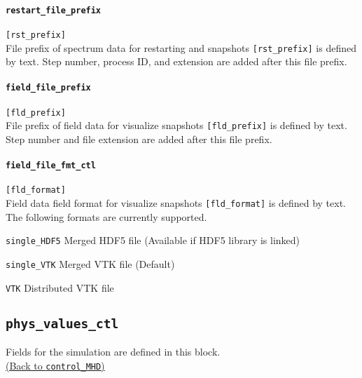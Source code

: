 \paragraph{\tt restart\_file\_prefix}
\label{href_t:restart_file_prefix}
\verb|[rst_prefix]| \\
File prefix of spectrum data for restarting and snapshots \verb|[rst_prefix]| is defined by text. Step number, process ID, and extension are added after this file prefix.

\paragraph{\tt field\_file\_prefix}
\label{href_t:field_file_prefix}
\verb|[fld_prefix]| \\
File prefix of field data for visualize snapshots \verb|[fld_prefix]| is defined by text. Step number and file extension are  added after this file prefix.

\paragraph{\tt field\_file\_fmt\_ctl}
\label{href_t:field_file_fmt_ctl}
\verb|[fld_format]| \\
Field data field format for visualize snapshots \verb|[fld_format]| is defined by text. The following formats are currently supported.
%
\begin{description}
\item{\tt single\_HDF5}  Merged HDF5 file (Available if HDF5 library is linked)
\item{\tt single\_VTK}   Merged VTK file (Default)
\item{\tt VTK}           Distributed VTK file
\end{description}
%

\subsection{\tt phys\_values\_ctl}
\label{href_t:phys_values_ctl}
Fields for the simulation are defined in this block. \\
\hyperref[href_i:phys_values_ctl]{(Back to {\tt control\_MHD})}
%
